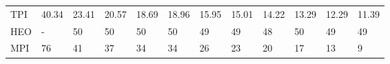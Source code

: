 \begin{table*}
{\begin{tabular}{llllllllllll}
TPI      &           40.34 &             23.41 &             20.57 &             18.69 &             18.96 &             15.95 &             15.01 &             14.22 &             13.29 &            12.29 &            11.39 \\
HEO      &               - &                50 &                50 &                50 &                50 &                49 &                49 &                48 &                50 &               49 &               49 \\
MPI      &              76 &                41 &                37 &                34 &                34 &                26 &                23 &                20 &                17 &               13 &                9 \\
\bottomrule
\end{tabular}}
\end{table*}



